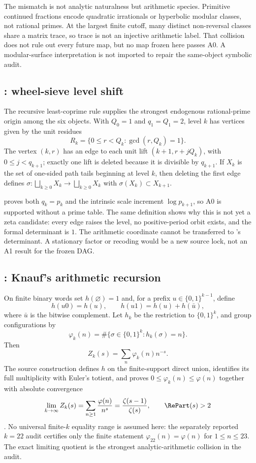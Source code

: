 The mismatch is not analytic naturalness but arithmetic species.  Primitive
continued fractions encode quadratic irrationals or hyperbolic modular
classes, not rational primes.  At the largest finite cutoff, many distinct
non-reversal classes share a matrix trace, so trace is not an injective
arithmetic label.  That collision does not rule out every future map, but no
map frozen here passes A0.  A modular-surface interpretation is not imported
to repair the same-object symbolic audit.

\subsection{: wheel-sieve level shift}

The recursive least-coprime rule supplies the strongest endogenous
rational-prime origin among the six objects.  With \(Q_0=1\) and
\(q_1=Q_1=2\), level \(k\) has vertices
given by the unit residues
\[
  R_k=\{0\le r<Q_k:\gcd(r,Q_k)=1\}.
\]
The vertex \((k,r)\) has an edge to each unit lift
\((k+1,r+jQ_k)\), with \(0\le j<q_{k+1}\); exactly one lift is deleted
because it is divisible by \(q_{k+1}\).  If \(X_k\) is the set of
one-sided path tails beginning at level \(k\), then deleting the first edge
defines \(\sigma:\bigsqcup_{k\ge0}X_k\to\bigsqcup_{k\ge0}X_k\) with
\(\sigma(X_k)\subset X_{k+1}\).

 proves both \(q_k=p_k\) and the intrinsic scale increment
\(\log p_{k+1}\), so A0 is supported without a prime table.  The same
definition shows why this is not yet a zeta candidate: every edge raises the
level, no positive-period orbit exists, and the formal determinant is \(1\).
The arithmetic coordinate cannot be transferred to 's
determinant.  A stationary factor or recoding would be a new source lock, not
an A1 result for the frozen DAG.

\subsection{: Knauf's arithmetic recursion}

On finite binary words set \(h(\varnothing)=1\) and, for a prefix
\(u\in\{0,1\}^{k-1}\), define
\[
  h(u0)=h(u),\qquad h(u1)=h(u)+h(\bar u),
\]
where \(\bar u\) is the bitwise complement.  Let \(h_k\) be the restriction
to \(\{0,1\}^k\), and group configurations by
\[
  \varphi_k(n)=\#\{\sigma\in\{0,1\}^k:h_k(\sigma)=n\}.
\]
Then
\[
  Z_k(s)=\sum_n\varphi_k(n)n^{-s}.
\]
The source construction defines \(h\) on the finite-support direct union,
identifies its full multiplicity with Euler's totient, and proves
\(0\le\varphi_k(n)\le\varphi(n)\) together with absolute convergence
\[
  \lim_{k\to\infty}Z_k(s)
  =\sum_{n\ge1}\frac{\varphi(n)}{n^s}
  =\frac{\zeta(s-1)}{\zeta(s)},\qquad \RePart(s)>2
\]
\citep{knauf2013adelic,knauf1998spin,knauf1999erratum}.  No universal
finite-\(k\) equality range is assumed here: the separately reported
\(k=22\) audit certifies only the finite statement
\(\varphi_{22}(n)=\varphi(n)\) for \(1\le n\le23\).  The exact limiting
quotient is the strongest analytic-arithmetic collision in the audit.

